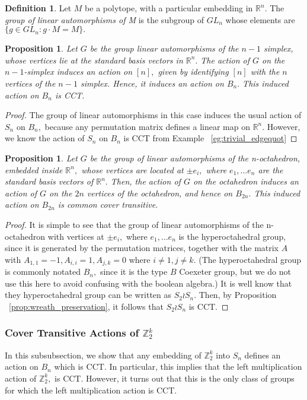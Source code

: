 \documentclass[10 pt]{amsart}
\theoremstyle{plain}
\newtheorem{prop}[thm]{Proposition}
\theoremstyle{definition}
\newtheorem{defn}[thm]{Definition}
\theoremstyle{remark}
\numberwithin{equation}{section}
\newcommand\sssec{\subsubsection}
\newcommand\BR{{\mathbb R}}
\newcommand\BBZ{{\mathbb Z}}
\newcommand\BZ{{\mathbb Z}}
\begin{document}
\begin{defn}
Let $M$ be a polytope, with a particular embedding in $\BR^n.$ The {\it group of linear automorphisms of M} is the subgroup of $GL_n$ whose elements are $\{g \in GL_n:g \cdot M = M\}.$
\end{defn}

\begin{prop}
Let $G$ be the group linear automorphisms of the $n-1$ simplex, whose vertices lie at the standard basis vectors in $\BR^n.$ The action of $G$ on the $n-1$-simplex induces an action on $[n],$ given by identifying $[n]$ with the $n$ vertices of the $n-1$ simplex. Hence, it induces an action on $B_n.$ This induced action on $B_n$ is CCT.
\end{prop}
\begin{proof}
The group of linear automorphisms in this case induces the usual action of $S_n$ on $B_n,$ because any permutation matrix defines a linear map on $\BR^n.$ However, we know the action of $S_n$ on $B_n$ is CCT from Example ~\ref{eg:trivial_edgequot}
\end{proof}

\begin{prop}
Let $G$ be the group of linear automorphisms of the n-octahedron, embedded inside $\BR^n,$ whose vertices are located at $\pm e_i,$ where $e_1,\ldots e_n$ are the standard basis vectors of $\BR^n.$ Then, the action of $G$ on the octahedron induces an action of $G$ on the $2n$ vertices of the octahedron, and hence on $B_{2n}.$ This induced action on $B_{2n}$ is common cover transitive. 
\end{prop}
\begin{proof}
It is simple to see that the group of linear automorphisms of the n-octahedron with vertices at $\pm e_i,$ where $e_1,\ldots e_n$ is the hyperoctahedral group, since it is generated by the permutation matrices, together with the matrix $A$ with $A_{1,1} = -1,A_{i,i} = 1,A_{j,k} = 0$ where $i \neq 1, j \neq k.$ (The hyperoctahedral group is commonly notated $B_n,$ since it is the type $B$ Coexeter group, but we do not use this here to avoid confusing with the boolean algebra.) It is well know that they hyperoctahedral group can be written as $S_2 \wr S_n.$ Then, by Proposition ~\ref{prop:wreath_preservation}, it follows that $S_2 \wr S_n$ is CCT.
\end{proof}

\sssec{Cover Transitive Actions of $\BZ_2^k$}

In this subsubsection, we show that any embedding of $\BBZ_2^k$ into $S_n$ defines an action on $B_n$ which is CCT. In particular, this implies that the left multiplication action of $\BBZ_2^k,$ is CCT. However, it turns out that this is the only class of groups for which the left multiplication action is CCT.
\end{document}
